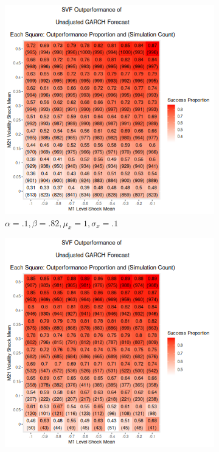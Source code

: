 \documentclass[11pt]{article}
\theoremstyle{definition}
\begin{document}
  \begin{figure}[h!]
    \centering
    \begin{subfigure}{.5\textwidth}
      \centering
      \includegraphics[scale=.45]{simulation_plots/dual_level_vol_shock_FriFeb0911:03:49PM2024.png}
      \caption{$\alpha = .1, \beta = .82, \mu_{x} = 1, \sigma_{x} = .1$}
      \label{fig:dual_shock_strong_betas_inside}
    \end{subfigure}%
    \begin{subfigure}{.5\textwidth}
      \centering
      \includegraphics[scale=.45]{simulation_plots/dual_level_vol_shock_FriFeb0911:27:59PM2024.png}

\end{subfigure}
\end{figure}
\end{document}
